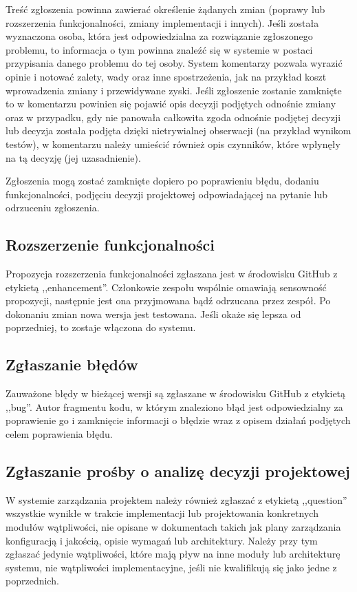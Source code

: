 \documentclass[a4paper]{article}
\begin{document}
Treść zgłoszenia powinna zawierać określenie żądanych zmian (poprawy lub rozszerzenia funkcjonalności, zmiany implementacji i innych).
Jeśli została wyznaczona osoba, która jest odpowiedzialna za rozwiązanie zgłoszonego problemu, to informacja o tym powinna znaleźć się w systemie w postaci przypisania danego problemu do tej osoby.
System komentarzy pozwala wyrazić opinie i notować zalety, wady oraz inne spostrzeżenia, jak na przykład koszt wprowadzenia zmiany i przewidywane zyski.
Jeśli zgłoszenie zostanie zamknięte to w komentarzu powinien się pojawić opis decyzji podjętych odnośnie zmiany oraz w przypadku, gdy nie panowała całkowita zgoda odnośnie podjętej decyzji lub decyzja została podjęta dzięki nietrywialnej obserwacji (na przykład wynikom testów), w komentarzu należy umieścić również opis czynników, które wpłynęły na tą decyzję (jej uzasadnienie).

Zgłoszenia mogą zostać zamknięte dopiero po poprawieniu błędu, dodaniu funkcjonalności, podjęciu decyzji projektowej odpowiadającej na pytanie lub odrzuceniu zgłoszenia.

\subsection{Rozszerzenie funkcjonalności}

Propozycja rozszerzenia funkcjonalności zgłaszana jest w środowisku GitHub z etykietą ,,enhancement''.
Członkowie zespołu wspólnie omawiają sensowność propozycji, następnie jest ona przyjmowana bądź odrzucana przez zespół.
Po dokonaniu zmian nowa wersja jest testowana. Jeśli okaże się lepsza od poprzedniej, to zostaje włączona do systemu.

\subsection{Zgłaszanie błędów}

Zauważone błędy w bieżącej wersji są zgłaszane w środowisku GitHub z etykietą ,,bug''.
Autor fragmentu kodu, w którym znaleziono błąd jest odpowiedzialny za poprawienie go i zamknięcie informacji o błędzie wraz z opisem działań podjętych celem poprawienia błędu.

\subsection{Zgłaszanie prośby o analizę decyzji projektowej}

W systemie zarządzania projektem należy również zgłaszać z etykietą ,,question'' wszystkie wynikłe w trakcie implementacji lub projektowania konkretnych modułów wątpliwości, nie opisane w dokumentach takich jak plany zarządzania konfiguracją i jakością, opisie wymagań lub architektury.
Należy przy tym zgłaszać jedynie wątpliwości, które mają pływ na inne moduły lub architekturę systemu, nie wątpliwości implementacyjne, jeśli nie kwalifikują się jako jedne z poprzednich.
\end{document}
